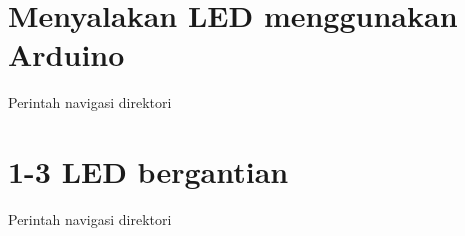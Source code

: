 \section{Menyalakan LED menggunakan Arduino}
Perintah navigasi direktori

\section{1-3 LED bergantian}
Perintah navigasi direktori
